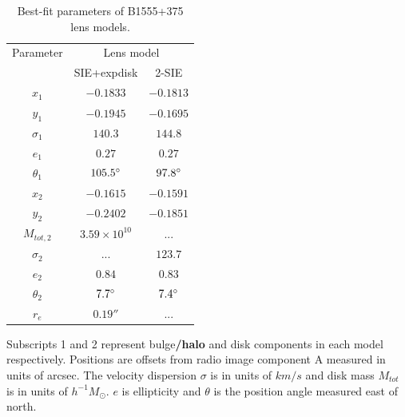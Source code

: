 \documentclass[useAMS,usenatbib]{mn2e}
\begin{document}
\begin{table}
  \caption{Best-fit parameters of B1555+375 lens models.}
  \begin{tabular}{@{}ccc}
\hline 
 Parameter  & \multicolumn{2}{c}{Lens model} \\
		&SIE+expdisk& 2-SIE		   
\\
\hline
$x_1$  	  & $-0.1833$	& $-0.1813$  \\
$y_1$	  &$-0.1945$	&$-0.1695$  \\

$\sigma_1$ &$140.3$     & $144.8$ \\
$e_1$	  & $0.27$	& $0.27$ \\
$\theta_1$ &$105.5 \hbox{$^\circ$}$ & $97.8 \hbox{$^\circ$}$ \\
\hline
$x_2$	  &$-0.1615$ 	&$-0.1591$  \\
$y_2$	  &$-0.2402$	& $-0.1851$  \\
$M_{tot,2}$  & $3.59\times 10^{10} $  & ...	 \\  
$\sigma_2$ & ...        &$123.7$ \\  
$e_2$	  &$0.84$	&$0.83$  \\
$\theta_2$ &$7.7\hbox{$^\circ$}$ &$7.4\hbox{$^\circ$}$  \\
$r_e$	  & $0.19 ''$ &  ... \\
\hline
\end{tabular}

\medskip
Subscripts 1 and 2 represent bulge\textbf{/halo} and disk components in each model respectively. Positions are offsets from radio image component A measured in units of arcsec. The velocity dispersion $\sigma$ is in units of $km/s$ and disk mass $M_{tot}$ is in units of $h^{-1} M_{\odot}$. $e$ is ellipticity and $\theta$ is the position angle measured east of north.

\end{table}
\end{document}
